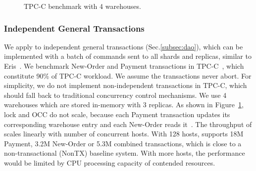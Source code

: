 \begin{figure}[t]
	\centering
	\hspace{0.02\textwidth}
	\hspace{0.02\textwidth}
	\vspace{-10pt}
	\caption{TPC-C benchmark with 4 warehouses.}
	\label{fig:tpc-c}
	\vspace{-10pt}
\end{figure}


\subsubsection{Independent General Transactions}
\label{subsec:eval-transactions}

We apply \sys to independent general transactions (Sec.\ref{subsec:dao}), which can be implemented with a batch of commands sent to all shards and replicas, similar to Eris~\cite{eris}.
We benchmark New-Order and Payment transactions in TPC-C~\cite{tpcc}, which constitute 90\% of TPC-C workload.
We assume the transactions never abort.
For simplicity, we do not implement non-independent transactions in TPC-C, which should fall back to traditional concurrency control mechanisms.
We use 4 warehouses which are stored in-memory with 3 replicas.
As shown in Figure~\ref{fig:tpc-c}, lock and OCC do not scale, because each Payment transaction updates its corresponding warehouse entry and each New-Order reads it~\cite{yu2014staring}.
The throughput of \sys scales linearly with number of concurrent hosts. With 128 hosts, \sys supports 18M Payment, 3.2M New-Order or 5.3M combined transactions, which is close to a non-transactional (NonTX) baseline system. With more hosts, the performance would be limited by CPU processing capacity of contended resources.

